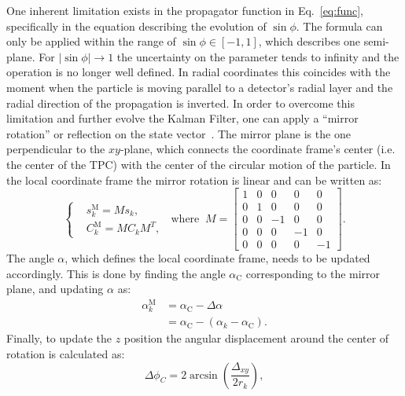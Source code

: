 One inherent limitation exists in the propagator function in Eq.~\ref{eq:func}, specifically in the equation describing the evolution of $\sin \phi$. The formula can only be applied within the range of $\sin \phi \in [-1,1]$, which describes one semi-plane. For $|\sin \phi|\rightarrow1$ the uncertainty on the parameter tends to infinity and the operation is no longer well defined. In radial coordinates this coincides with the moment when the particle is moving parallel to a detector's radial layer and the radial direction of the propagation is inverted. In order to overcome this limitation and further evolve the Kalman Filter, one can apply a \enquote{mirror rotation} or reflection on the state vector~\cite{lay2003linear}. The mirror plane is the one perpendicular to the $xy$-plane,  which connects the coordinate frame's center (i.e. the center of the TPC) with the center of the circular motion of the particle. In the local coordinate frame the mirror rotation is linear and can be written as:
\begin{equation}\label{eq:mirror}
    \left\{
    \begin{aligned}
        &s_k^\textrm{M} = M s_k,\\
        &C_k^\textrm{M} = M C_k M^T,
    \end{aligned}
    \right.
    \;\; \textrm{where} \;\;
    M=\begin{bmatrix}
    1 & 0 & 0 & 0& 0 \\
    0 & 1 & 0 & 0& 0 \\
    0 & 0 & -1 & 0& 0 \\
    0 & 0 & 0 & -1& 0 \\
    0 & 0 & 0 & 0& -1 
    \end{bmatrix}.
\end{equation}
The angle $\alpha$, which defines the local coordinate frame, needs to be updated accordingly. This is done by finding the angle $\alpha_\textrm{C}$ corresponding to the mirror plane, and updating $\alpha$ as:
\begin{equation}
    \begin{aligned}
       \alpha _k^\textrm{M} &=\alpha_\textrm{C}-\Delta \alpha \\
                   &= \alpha_\textrm{C}-(\alpha_k-\alpha_\textrm{C}).
    \end{aligned}   
\end{equation} 
Finally, to update the $z$ position the angular displacement around the center of rotation is calculated as:
\begin{equation}
    \Delta \phi_C = 2\arcsin \left( \frac{\Delta_{xy}}{2r_k} \right),
\end{equation}
